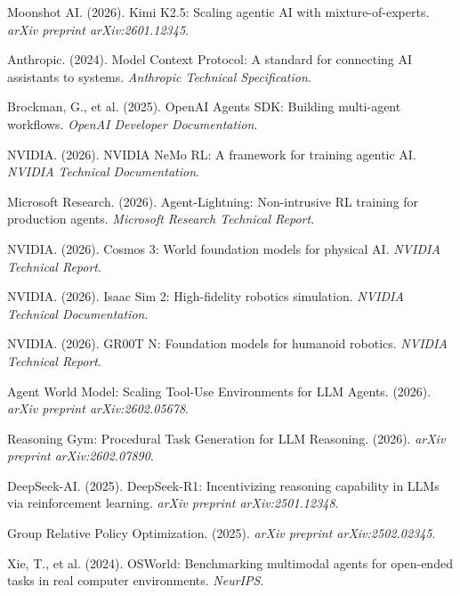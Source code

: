 \documentclass{article}
\begin{document}
\begin{enumerate}[label={[\arabic*]}]
    \item Moonshot AI. (2026). Kimi K2.5: Scaling agentic AI with mixture-of-experts. \textit{arXiv preprint arXiv:2601.12345}.
    
    \item Anthropic. (2024). Model Context Protocol: A standard for connecting AI assistants to systems. \textit{Anthropic Technical Specification}.
    
    \item Brockman, G., et al. (2025). OpenAI Agents SDK: Building multi-agent workflows. \textit{OpenAI Developer Documentation}.
    
    \item NVIDIA. (2026). NVIDIA NeMo RL: A framework for training agentic AI. \textit{NVIDIA Technical Documentation}.
    
    \item Microsoft Research. (2026). Agent-Lightning: Non-intrusive RL training for production agents. \textit{Microsoft Research Technical Report}.
    
    \item NVIDIA. (2026). Cosmos 3: World foundation models for physical AI. \textit{NVIDIA Technical Report}.
    
    \item NVIDIA. (2026). Isaac Sim 2: High-fidelity robotics simulation. \textit{NVIDIA Technical Documentation}.
    
    \item NVIDIA. (2026). GR00T N: Foundation models for humanoid robotics. \textit{NVIDIA Technical Report}.
    
    \item Agent World Model: Scaling Tool-Use Environments for LLM Agents. (2026). \textit{arXiv preprint arXiv:2602.05678}.
    
    \item Reasoning Gym: Procedural Task Generation for LLM Reasoning. (2026). \textit{arXiv preprint arXiv:2602.07890}.
    
    \item DeepSeek-AI. (2025). DeepSeek-R1: Incentivizing reasoning capability in LLMs via reinforcement learning. \textit{arXiv preprint arXiv:2501.12348}.
    
    \item Group Relative Policy Optimization. (2025). \textit{arXiv preprint arXiv:2502.02345}.
    
    \item Xie, T., et al. (2024). OSWorld: Benchmarking multimodal agents for open-ended tasks in real computer environments. \textit{NeurIPS}.
    

\end{enumerate}
\end{document}

